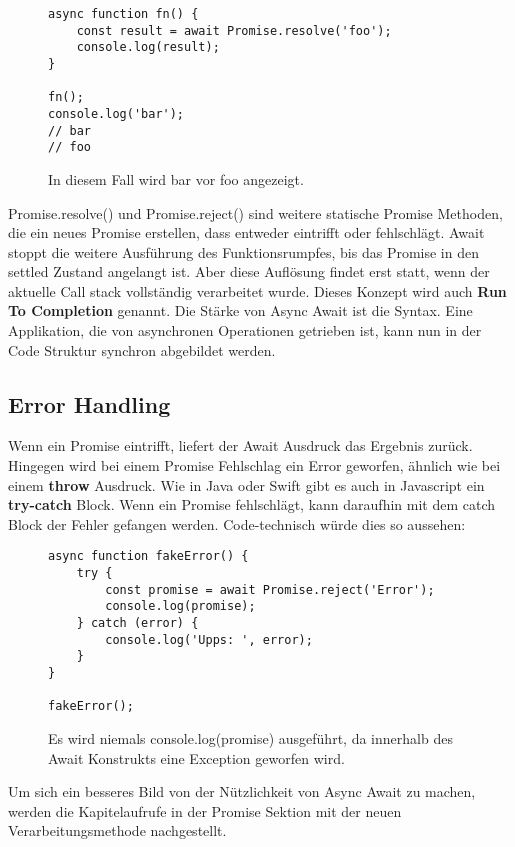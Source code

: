 \begin{figure}[H]
\begin{lstlisting}[basicstyle=\small]
async function fn() {
    const result = await Promise.resolve('foo');
    console.log(result);
}

fn();
console.log('bar');
// bar
// foo
\end{lstlisting}
\caption{In diesem Fall wird bar vor foo angezeigt.}
\end{figure}

\noindent
Promise.resolve() und Promise.reject() sind weitere statische Promise Methoden, die ein neues Promise erstellen, dass entweder eintrifft oder fehlschlägt. Await stoppt die weitere Ausführung des Funktionsrumpfes, bis das Promise in den settled Zustand angelangt ist. Aber diese Auflösung findet erst statt, wenn der aktuelle Call stack vollständig verarbeitet wurde. Dieses Konzept wird auch \textbf{Run To Completion} genannt. Die Stärke von Async Await ist die Syntax. Eine Applikation, die von asynchronen Operationen getrieben ist, kann nun in der Code Struktur synchron abgebildet werden. 

\subsection{Error Handling}
Wenn ein Promise eintrifft, liefert der Await Ausdruck das Ergebnis zurück. Hingegen wird bei einem Promise Fehlschlag ein Error geworfen, ähnlich wie bei einem \textbf{throw} Ausdruck. Wie in Java oder Swift gibt es auch in Javascript ein \textbf{try-catch} Block. Wenn ein Promise fehlschlägt, kann daraufhin mit dem catch Block der Fehler gefangen werden. Code-technisch würde dies so aussehen: 

\begin{figure}[H]
\begin{lstlisting}[basicstyle=\small]
async function fakeError() {
    try {
        const promise = await Promise.reject('Error');
        console.log(promise);
    } catch (error) {
        console.log('Upps: ', error);
    }
}

fakeError();
\end{lstlisting}
\caption{Es wird niemals console.log(promise) ausgeführt, da innerhalb des Await Konstrukts eine Exception geworfen wird.}
\end{figure}

\noindent
Um sich ein besseres Bild von der Nützlichkeit von Async Await zu machen, werden die Kapitelaufrufe in der Promise Sektion mit der neuen Verarbeitungsmethode nachgestellt. 

